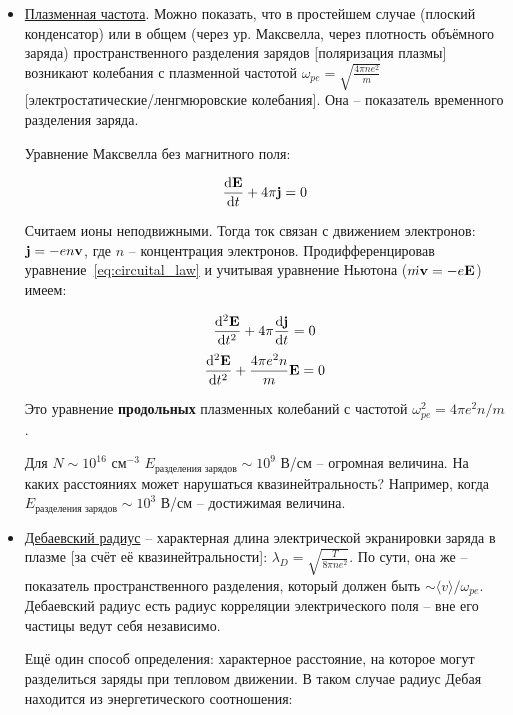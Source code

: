 \documentclass[10pt, a4paper]{article}
\begin{document}
\begin{itemize}
	\item \uline{Плазменная частота}. Можно показать, что в простейшем случае (плоский конденсатор) или в общем (через ур. Максвелла, через плотность объёмного заряда) пространственного разделения зарядов [поляризация плазмы] возникают колебания с плазменной частотой $\omega_{pe} = \sqrt{\frac{4\pi n e^2}{m}}$ [электростатические/ленгмюровские колебания]. Она -- показатель временного разделения заряда.
	
	Уравнение Максвелла без магнитного поля:
	
	\begin{equation}
		\label{eq:circuital_law}
		\dv{\vb{E}}{t} + 4\pi \vb{j} = 0
	\end{equation}

	Считаем ионы неподвижными. Тогда ток связан с движением электронов: $\vb{j}=-en\vb{v}$, где $n$ -- концентрация электронов. Продифференцировав уравнение~\eqref{eq:circuital_law} и учитывая уравнение Ньютона ($\dot{m\vb{v}}=-e\vb{E}$) имеем:
	
	\begin{equation*}
		\dv[2]{\vb{E}}{t}+4\pi\dv{\vb{j}}{t} = 0
	\end{equation*}
	\begin{equation}
		\dv[2]{\vb{E}}{t}+\frac{4\pi e^2 n}{m}\vb{E} = 0 
	\end{equation}

	Это уравнение \textbf{продольных} плазменных колебаний с частотой $\omega_{pe}^2=4\pi e^2 n/m$.
	
	Для $N\sim 10^{16}$ см$^{-3}$ $E_\text{разделения зарядов} \sim 10^9$ В/см -- огромная величина. На каких расстояниях может нарушаться квазинейтральность? Например, когда $E_\text{разделения зарядов} \sim 10^3$ В/см -- достижимая величина.
	
	\item \uline{Дебаевский радиус} -- характерная длина электрической экранировки заряда в плазме [за счёт её квазинейтральности]: $\lambda_D = \sqrt{\frac{T}{8\pi ne^2}}$. По сути, она же -- показатель пространственного разделения, который должен быть $\sim \langle v \rangle/\omega_{pe}$. Дебаевский радиус есть радиус корреляции электрического поля -- вне его частицы ведут себя независимо.
	
	Ещё один способ определения: характерное расстояние, на которое могут разделиться заряды при тепловом движении. В таком случае радиус Дебая находится из энергетического соотношения:
	

\end{itemize}
\end{document}
